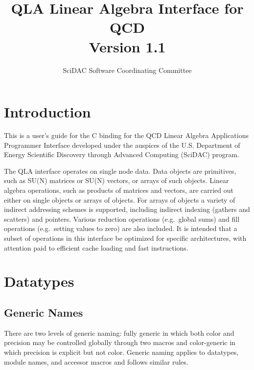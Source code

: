 \documentclass{article}
\begin{document}
\title{
   QLA Linear Algebra Interface for QCD \\{\large Version 1.1}
}
\author{ SciDAC Software Coordinating Committee}

\maketitle
\section{Introduction}
This is a user's guide for the C binding for the QCD Linear Algebra
Applications Programmer Interface developed under the auspices of the
U.S. Department of Energy Scientific Discovery through Advanced
Computing (SciDAC) program.

The QLA interface operates on single node data.  Data objects are
primitives, such as SU(N) matrices or SU(N) vectors, or arrays of such
objects.  Linear algebra operations, such as products of matrices and
vectors, are carried out either on single objects or arrays of
objects.  For arrays of objects a variety of indirect addressing
schemes is supported, including indirect indexing (gathers and
scatters) and pointers.  Various reduction operations (e.g.\ global
sums) and fill operations (e.g.\ setting values to zero) are also
included.  It is intended that a subset of operations in this
interface be optimized for specific architectures, with attention
paid to efficient cache loading and fast instructions.

\section{Datatypes}
\label{sec.datatypes}

\subsection{Generic Names}

There are two levels of generic naming: fully generic in which both
color and precision may be controlled globally through two macros and
color-generic in which precision is explicit but not color.  Generic
naming applies to datatypes, module names, and accessor macros and
follows similar rules.
\end{document}
